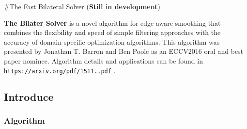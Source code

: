 \#\+The Fast Bilateral Solver ({\bfseries Still in development})

{\bfseries The Bilater Solver} is a novel algorithm for edge-\/aware smoothing that combines the flexibility and speed of simple filtering approaches with the accuracy of domain-\/specific optimization algorithms. This algorithm was presented by Jonathan T. Barron and Ben Poole as an E\+C\+C\+V2016 oral and best paper nominee. Algorithm details and applications can be found in \href{https://arxiv.org/pdf/1511.03296.pdf}{\tt https\+://arxiv.\+org/pdf/1511..\+pdf} .







 \subsection*{Introduce}

\subsubsection*{Algorithm}

